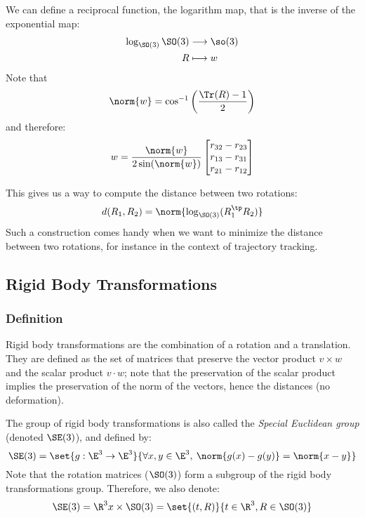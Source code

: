 We can define a reciprocal function, the logarithm map, that is the inverse of the exponential map:
\begin{equation*}
    \begin{aligned}
        \log_{\SO(3)}\SO(3)&\longrightarrow \so(3)\\
        R&\longmapsto w
    \end{aligned}
\end{equation*}
Note that
\begin{equation*}
    \norm{w}=\cos^{-1}\left(\frac{\Tr(R)-1}{2}\right)
\end{equation*}
and therefore:
\begin{equation*}
    w=\frac{\norm{w}}{2\sin(\norm{w})}\begin{bmatrix}
        r_{32}-r_{23} \\
        r_{13}-r_{31} \\
        r_{21}-r_{12}
    \end{bmatrix}
\end{equation*}

This gives us a way to compute the distance between two rotations:
\begin{equation*}
    d(R_1, R_2) = \norm{\log_{\SO(3)}(R_1^\tp R_2)}
\end{equation*}
Such a construction comes handy when we want to minimize the distance between two rotations, for instance in the context of trajectory tracking.

\subsection{Rigid Body Transformations}
\subsubsection{Definition}
Rigid body transformations are the combination of a rotation and a translation. They are defined as the set of matrices that preserve the vector product $v\times w$ and the scalar product $v\cdot w$; note that the preservation of the scalar product implies the preservation of the norm of the vectors, hence the distances (no deformation).

The group of rigid body transformations is also called the \emph{Special Euclidean group} (denoted $\SE(3)$), and defined by:
\begin{equation*}
    \SE(3) = \set{g:\E^3\to\E^3}{\forall x, y\in\E^3, \: \norm{g(x)-g(y)}=\norm{x-y}}
\end{equation*}
Note that the rotation matrices ($\SO(3)$) form a subgroup of the rigid body transformations group. Therefore, we also denote:
\begin{equation*}
    \SE(3) = \R^3x\times\SO(3) = \set{(t, R)}{t\in\R^3, R\in\SO(3)}
\end{equation*}

